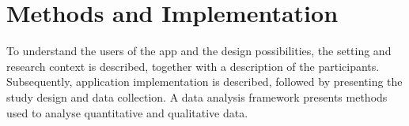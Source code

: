 \chapter{Methods and Implementation}\label{cha:Method}





To understand the users of the app and the design possibilities, the setting and research context is described, together with a description of the participants. Subsequently, application implementation is described, followed by presenting the study design and data collection. A data analysis framework presents methods used to analyse quantitative and qualitative data.












